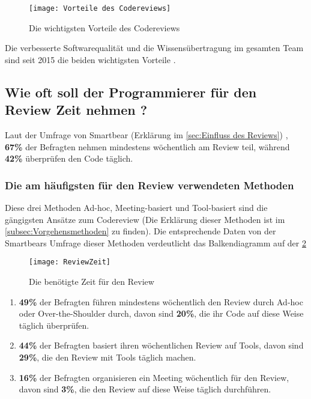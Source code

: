 \begin{figure}[H]
	\centering
	\texttt{[image: Vorteile des Codereviews]}
	\caption[Vorteile des Codereviews]{Die wichtigsten Vorteile des Codereviews\\ \cite{smartbear}}
	\label{fig:Vorteile des Codereviews}
\end{figure}

Die verbesserte Softwarequalität und die Wissensübertragung im gesamten Team sind seit 2015 die beiden wichtigsten Vorteile \cite{smartbear}.

\subsection{Wie oft soll der Programmierer für den Review Zeit nehmen ?}
\label{subsec:reviewerZeit}

Laut der Umfrage von Smartbear (Erklärung im \cref{sec:Einfluss des Reviews}) \cite{smartbear}, \textbf{67\%} der Befragten nehmen mindestens wöchentlich am Review teil, während \textbf{42\%} überprüfen den Code täglich.

\subsubsection{Die am häufigsten für den Review verwendeten Methoden}
\label{subsubsec:Die am häufigsten verwendete Methoden}

Diese drei Methoden Ad-hoc, Meeting-basiert und Tool-basiert sind die gängigsten Ansätze zum Codereview (Die Erklärung dieser Methoden ist im \cref{subsec:Vorgehensmethoden} zu finden).
Die entsprechende Daten von der Smartbears Umfrage \cite{smartbear} dieser Methoden verdeutlicht das Balkendiagramm auf der \cref{fig:ReviewZeit} 

\begin{figure}[H]
	\centering
	\texttt{[image: ReviewZeit]}
	\caption[Reviews Zeit]{Die benötigte Zeit für den Review\\ \cite{smartbear}}
	\label{fig:ReviewZeit}
\end{figure}

\begin{enumerate}
	\item \textbf{49\%} der Befragten führen mindestens wöchentlich den Review durch Ad-hoc oder Over-the-Shoulder durch, davon sind \textbf{20\%}, die ihr Code auf diese Weise 					täglich überprüfen.
	\item \textbf{44\%} der Befragten basiert ihren wöchentlichen Review auf Tools, davon sind \textbf{29\%}, die den Review mit Tools täglich machen.
	\item \textbf{16\%} der Befragten organisieren ein Meeting wöchentlich für den Review, davon sind \textbf{3\%}, die den Review auf diese Weise täglich durchführen.
\end{enumerate}


